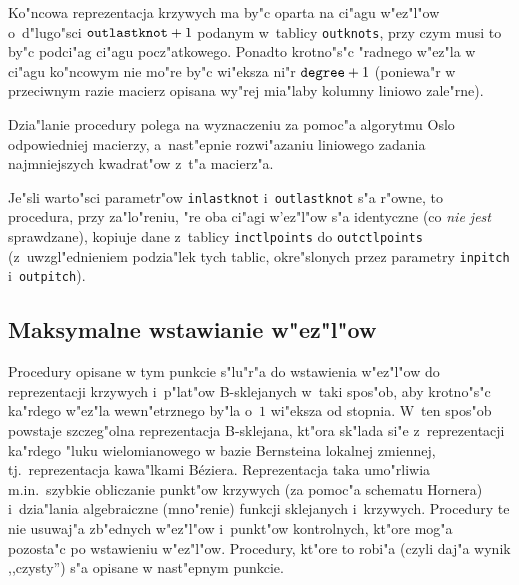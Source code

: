 Ko"ncowa reprezentacja krzywych ma by"c oparta na ci"agu w"ez"l"ow
o~d"lugo"sci $\mathord{\mbox{\texttt{outlastknot}}}+1$ podanym w~tablicy
\texttt{outknots}, przy czym musi to by"c podci"ag ci"agu pocz"atkowego.
Ponadto krotno"s"c "radnego w"ez"la w ci"agu ko"ncowym nie mo"re by"c
wi"eksza ni"r $\mathord{\mbox{\texttt{degree}}}+1$ (poniewa"r w przeciwnym
razie macierz opisana wy"rej mia"laby kolumny liniowo zale"rne).

Dzia"lanie procedury polega na wyznaczeniu za pomoc"a algorytmu Oslo
odpowiedniej macierzy, a~nast"epnie rozwi"azaniu liniowego zadania
najmniejszych kwad\-ra\-t"ow z~t"a macierz"a.

Je"sli warto"sci parametr"ow \texttt{inlastknot} i~\texttt{outlastknot}
s"a r"owne, to procedura, przy za"lo"reniu, "re oba ci"agi w'ez"l"ow s"a
identyczne (co \emph{nie jest} sprawdzane), kopiuje dane z~tablicy
\texttt{inctlpoints} do \texttt{outctlpoints} (z~uwzgl"ednieniem podzia"lek
tych tablic, okre"slonych przez parametry \texttt{inpitch}
i~\texttt{outpitch}).


\subsection{\label{ssect:max:knot:ins}Maksymalne wstawianie w"ez"l"ow}

Procedury opisane w tym punkcie s"lu"r"a do wstawienia w"ez"l"ow do
reprezentacji krzywych i~p"lat"ow B-sklejanych w~taki spos"ob, aby
krotno"s"c ka"rdego w"ez"la wewn"etrznego by"la o~$1$ wi"eksza od stopnia.
W~ten spos"ob powstaje szczeg"olna reprezentacja B-sklejana, kt"ora sk"lada
si"e z~reprezentacji ka"rdego "luku wielomianowego w bazie Bernsteina lokalnej
zmiennej, tj.\ reprezentacja kawa"lkami B\'{e}ziera. Reprezentacja taka
umo"rliwia m.in.\ szybkie obliczanie punkt"ow krzywych (za pomoc"a schematu
Hornera) i~dzia"lania algebraiczne (mno"renie) funkcji sklejanych
i~krzywych. Procedury te nie usuwaj"a
zb"ednych w"ez"l"ow i~punkt"ow kontrolnych, kt"ore mog"a pozosta"c po
wstawieniu w"ez"l"ow. Procedury, kt"ore to robi"a (czyli daj"a wynik
,,czysty'') s"a opisane w nast"epnym punkcie.

